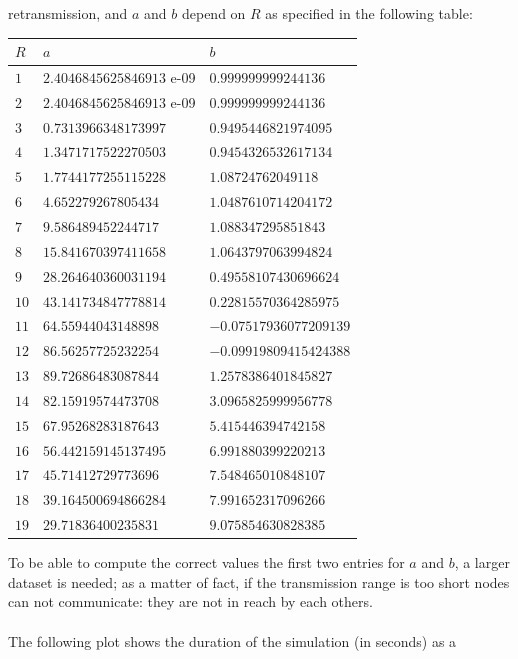retransmission, and $a$ and $b$ depend on $R$ as specified in the following
table:
\begin{center}
\begin{tabular}{ | m{1cm} | m{5cm}| m{5cm} | }
\hline
$R$&$a$&$b$\\
\hline
$1$&$2.4046845625846913$ e-09&$0.999999999244136$\\
\hline
$2$&$2.4046845625846913$ e-09&$0.999999999244136$\\
\hline
$3$&$0.7313966348173997$&$0.9495446821974095$\\
\hline
$4$&$1.3471717522270503$&$0.9454326532617134$\\
\hline
$5$&$1.7744177255115228$&$1.08724762049118$\\
\hline
$6$&$4.652279267805434$&$1.0487610714204172$\\
\hline
$7$&$9.586489452244717$&$1.088347295851843$\\
\hline
$8$&$15.841670397411658$&$1.0643797063994824$\\
\hline
$9$&$28.264640360031194$&$0.49558107430696624$\\
\hline
$10$&$43.141734847778814$&$0.22815570364285975$\\
\hline
$11$&$64.55944043148898$&$-0.07517936077209139$\\
\hline
$12$&$86.56257725232254$&$-0.09919809415424388$\\
\hline
$13$&$89.72686483087844$&$1.2578386401845827$\\
\hline
$14$&$82.15919574473708$&$3.0965825999956778$\\
\hline
$15$&$67.95268283187643$&$5.415446394742158$\\
\hline
$16$&$56.442159145137495$&$6.991880399220213$\\
\hline
$17$&$45.71412729773696$&$7.548465010848107$\\
\hline
$18$&$39.164500694866284$&$7.991652317096266$\\
\hline
$19$&$29.71836400235831$&$9.075854630828385$\\
\hline
\end{tabular}
\end{center}
To be able to compute the correct values the first two entries for $a$ and $b$,
a larger dataset is needed; as a matter of fact, if the transmission range is
too short nodes can not communicate: they are not in reach by each others.\\
\\
The following plot shows the duration of the simulation (in seconds) as a
